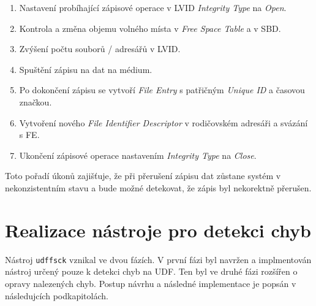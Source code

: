 \begin{enumerate}
    \item Nastavení probíhající zápisové operace v LVID \textit{Integrity Type} na \textit{Open}.
    \item Kontrola a změna objemu volného místa v \textit{Free Space Table} a v SBD.
    \item Zvýšení počtu souborů / adresářů v LVID.
    \item Spuštění zápisu na dat na médium.
    \item Po dokončení zápisu se vytvoří \textit{File Entry} s patřičným \textit{Unique ID} a časovou značkou. 
    \item Vytvoření nového \textit{File Identifier Descriptor} v rodičovském adresáři a svázání s FE.
    \item Ukončení zápisové operace nastavením \textit{Integrity Type} na \textit{Close}.
\end{enumerate}
Toto pořadí úkonů zajišťuje, že při přerušení zápisu dat zůstane systém v nekonzistentním stavu a bude možné detekovat, že zápis byl nekorektně přerušen.

\chapter{Realizace nástroje pro detekci chyb}
\label{ch:realizace}
Nástroj \texttt{udffsck} vznikal ve dvou fázích. V první fázi byl navržen a implmentován nástroj určený pouze k detekci chyb na UDF. Ten byl ve druhé fázi rozšířen o opravy nalezených chyb. Postup návrhu a následné implementace je popsán v následujcích podkapitolách.

